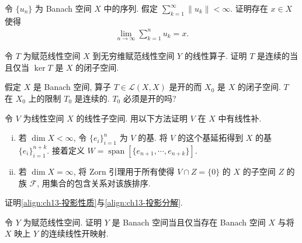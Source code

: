 \documentclass[../../main.tex]{subfiles}
\begin{document}
\begin{exercise}\label{exercise:ch13-32}
令 $\{u_{n}\}$ 为 Banach 空间 $X$ 中的序列. 假定 $\sum_{k=1}^{\infty}\|u_{k}\|<\infty$. 证明存在 $x\in X$ 使得
\begin{align*}
\lim_{n\to\infty}\sum_{k=1}^{n}u_{k}=x.
\end{align*}
\end{exercise}

\begin{exercise}\label{exercise:ch13-33}
令 $T$ 为赋范线性空间 $X$ 到无穷维赋范线性空间 $Y$ 的线性算子. 证明 $T$ 是连续的当且仅当 $\ker T$ 是 $X$ 的闭子空间.
\end{exercise}

\begin{exercise}\label{exercise:ch13-34}
假定 $X$ 是 Banach 空间, 算子 $T\in\mathcal{L}(X,X)$ 是开的而 $X_{0}$ 是 $X$ 的闭子空间. $T$ 在 $X_{0}$ 上的限制 $T_{0}$ 是连续的. $T_{0}$ 必须是开的吗?
\end{exercise}

\begin{exercise}\label{exercise:ch13-35}
令 $V$ 为线性空间 $X$ 的线性子空间. 用以下方法证明 $V$ 在 $X$ 中有线性补.
\begin{enumerate}[(i)]
\item 若 $\dim X<\infty$, 令 $\{e_{i}\}_{i=1}^{n}$ 为 $V$ 的基. 将 $V$ 的这个基延拓得到 $X$ 的基 $\{e_{i}\}_{i=1}^{n+k}$. 接着定义 $W=\operatorname{span}[\{e_{n+1},\cdots,e_{n+k}\}]$.
\item 若 $\dim X=\infty$, 将 Zorn 引理用于所有使得 $V\cap Z=\{0\}$ 的 $X$ 的子空间 $Z$ 的族 $\mathcal{F}$, 用集合的包含关系对该族排序.
\end{enumerate}
\end{exercise}

\begin{exercise}\label{exercise:ch13-36}
证明\eqref{align:ch13-投影性质}与\eqref{align:ch13-投影分解}.
\end{exercise}

\begin{exercise}\label{exercise:ch13-37}
令 $Y$ 为赋范线性空间. 证明 $Y$ 是 Banach 空间当且仅当存在 Banach 空间 $X$ 与将 $X$ 映上 $Y$ 的连续线性开映射.
\end{exercise}
\end{document}
